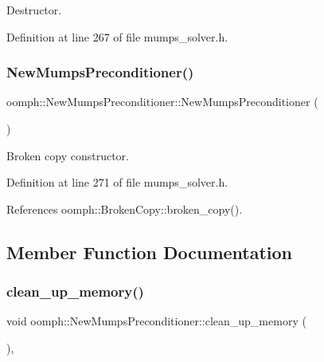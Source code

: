 Destructor. 



Definition at line 267 of file mumps\+\_\+solver.\+h.

\mbox{\label{classoomph_1_1NewMumpsPreconditioner_a32bb5cf92d1f3976d81e63bdccfa9a86}} 
\subsubsection{\texorpdfstring{New\+Mumps\+Preconditioner()}{NewMumpsPreconditioner()}\hspace{0.1cm}{\footnotesize\ttfamily [2/2]}}
{\footnotesize\ttfamily oomph\+::\+New\+Mumps\+Preconditioner\+::\+New\+Mumps\+Preconditioner (\begin{DoxyParamCaption}\item[{const \hyperlink{classoomph_1_1NewMumpsPreconditioner}{New\+Mumps\+Preconditioner} \&}]{ }\end{DoxyParamCaption})\hspace{0.3cm}{\ttfamily [inline]}}



Broken copy constructor. 



Definition at line 271 of file mumps\+\_\+solver.\+h.



References oomph\+::\+Broken\+Copy\+::broken\+\_\+copy().



\subsection{Member Function Documentation}
\mbox{\label{classoomph_1_1NewMumpsPreconditioner_a4a6cb6cc1207a765cc02ef47c6efa6e0}} 
\subsubsection{\texorpdfstring{clean\+\_\+up\+\_\+memory()}{clean\_up\_memory()}}
{\footnotesize\ttfamily void oomph\+::\+New\+Mumps\+Preconditioner\+::clean\+\_\+up\+\_\+memory (\begin{DoxyParamCaption}{ }\end{DoxyParamCaption})\hspace{0.3cm}{\ttfamily [inline]}, {\ttfamily [virtual]}}



